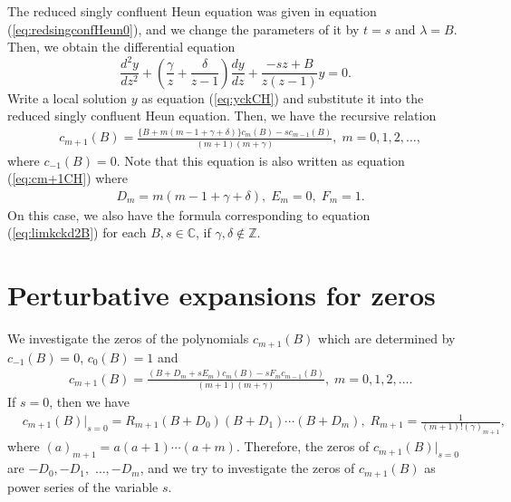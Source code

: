 \documentclass[12pt]{amsart}
\newcommand{\Zint}{\mathbb {Z}}
\newcommand{\Cplx}{\mathbb {C}}     %
\numberwithin{equation}{section}
\theoremstyle{definition}
\theoremstyle{remark}
\begin{document}
The reduced singly confluent Heun equation was given in equation (\ref{eq:redsingconfHeun0}), and we change the parameters of it by $t=s$ and $\lambda =B$.
Then, we obtain the differential equation
\begin{equation}
\frac{d^2y}{dz^2} + \left( \frac{\gamma}{z}+\frac{\delta }{z-1} \right) \frac{dy}{dz} +\frac{-s z + B }{z(z-1)} y=0 .
\end{equation}
Write a local solution $y$ as equation (\ref{eq:yckCH}) and substitute it into the reduced singly confluent Heun equation.
Then, we have the recursive relation
\begin{align}
& c_{m+1} (B) = \frac{\{ B+m(m-1+\gamma+\delta) \} c_{m} (B) -s c_{m-1} (B)}{(m+1)(m+\gamma )},  \; m=0,1,2, \dots ,
\label{eq:cm+1rCH}
\end{align}
where $c_{-1} (B)=0$.
Note that this equation is also written as equation (\ref{eq:cm+1CH}) where 
\begin{align}
& D_{m}= m(m-1+\gamma+\delta), \; E_m=0 , \; F_{m}=1 . 
\end{align}
On this case, we also have the formula corresponding to equation (\ref{eq:limkckd2B}) for each $B, s  \in \Cplx $, if $\gamma , \delta \not \in \Zint $.

\section{Perturbative expansions for zeros} \label{sec:pert}

We investigate the zeros of the polynomials $c_{m+1} (B) $ which are determined by $c_{-1} (B)=0$, $c_{0} (B)=1$ and
\begin{align}
& c_{m+1} (B) = \frac{(B+D_m +s E_m) c_{m} (B) -s F_m c_{m-1} (B)}{(m+1)(m+\gamma )} ,  \; m=0,1,2, \dots .
\label{eq:cm+1mm-1}
\end{align}
If $s=0$, then we have 
\begin{align}
& c_{m+1} (B) | _{s=0} = R_{m+1} (B+D_0) (B+D_1 ) \cdots (B+D_{m}), \; R_{m+1} = \frac{1}{(m +1) ! (\gamma )_{m+1} } , 
\end{align}
where $(a)_{m+1}  = a (a+1) \cdots (a+m)$.
Therefore, the zeros of $ c_{m+1} (B) | _{s=0} $ are $-D_0, -D_1,$ $ \dots , -D_m$, and we try to investigate the zeros of $c_{m+1} (B)  $ as power series of the variable $s$.
\end{document}
